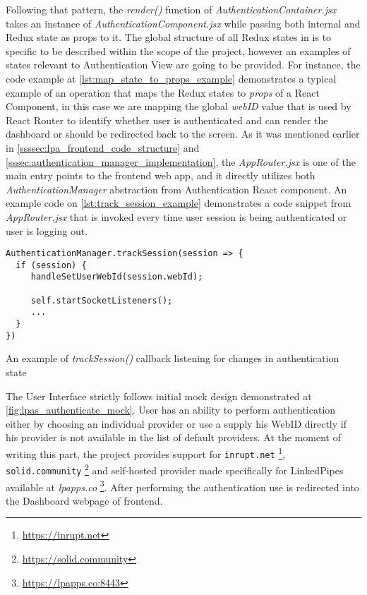Following that pattern, the \textit{render()} function of \textit{AuthenticationContainer.jsx} takes an instance of \textit{AuthenticationComponent.jsx} while passing both internal and Redux state as props to it. The global structure of all Redux states in \lpa{} is to specific to be described within the scope of the \lpas{} project, however an examples of states relevant to Authentication View are going to be provided. For instance, the code example at \autoref{lst:map_state_to_props_example} demonstrates a typical example of an operation that maps the Redux states to \textit{props} of a React Component, in this case we are mapping the global \textit{webID} value that is used by React Router to identify whether user is authenticated and can render the dashboard or should be redirected back to the screen. As it was mentioned earlier in \autoref{ssssec:lpa_frontend_code_structure} and \autoref{sssec:authentication_manager_implementation}, the \textit{AppRouter.jsx} is one of the main entry points to the frontend web app, and it directly utilizes both \textit{AuthenticationManager} abstraction from Authentication React component. An example code on \autoref{lst:track_session_example} demonstrates a code snippet from \textit{AppRouter.jsx} that is invoked every time user session is being authenticated or user is logging out.

\begin{listing}[H]    
\begin{verbatim}
AuthenticationManager.trackSession(session => {
  if (session) {
     handleSetUserWebId(session.webId);

     self.startSocketListeners();
     ...
  }
})
\end{verbatim}
\caption{An example of \textit{trackSession()} callback listening for changes in authentication state} 
\label{lst:track_session_example}
\end{listing}

The User Interface strictly follows initial mock design demonstrated at \autoref{fig:lpas_authenticate_mock}. User has an ability to perform authentication either by choosing an individual \solid{} provider or use a supply his WebID directly if his \solid{} provider is not available in the list of default providers. At the moment of writing this part, the project provides support for \texttt{inrupt.net} \footnote{\url{https://inrupt.net}}, \texttt{solid.community} \footnote{\url{https://solid.community}} and self-hosted provider made specifically for LinkedPipes available at \textit{lpapps.co} \footnote{\url{https://lpapps.co:8443}}. After performing the authentication use is redirected into the Dashboard webpage of \lpa{} frontend.

